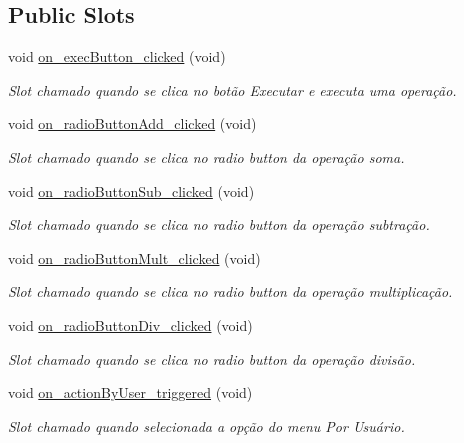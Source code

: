 \subsection*{Public Slots}
\begin{DoxyCompactItemize}
\item 
void \hyperlink{classMyCalcWindow_a6fdaf67619d3127503232c656e712656}{on\+\_\+exec\+Button\+\_\+clicked} (void)
\begin{DoxyCompactList}\small\item\em Slot chamado quando se clica no botão \textquotesingle{}Executar\textquotesingle{} e executa uma operação. \end{DoxyCompactList}\item 
void \hyperlink{classMyCalcWindow_ae1c714a5ad30c0fc67b9944481b30a05}{on\+\_\+radio\+Button\+Add\+\_\+clicked} (void)
\begin{DoxyCompactList}\small\item\em Slot chamado quando se clica no radio button da operação soma. \end{DoxyCompactList}\item 
void \hyperlink{classMyCalcWindow_a01fac328f5546feb830a67a7d35cc7f5}{on\+\_\+radio\+Button\+Sub\+\_\+clicked} (void)
\begin{DoxyCompactList}\small\item\em Slot chamado quando se clica no radio button da operação subtração. \end{DoxyCompactList}\item 
void \hyperlink{classMyCalcWindow_a553593de7766d99faf23a2053ddb4281}{on\+\_\+radio\+Button\+Mult\+\_\+clicked} (void)
\begin{DoxyCompactList}\small\item\em Slot chamado quando se clica no radio button da operação multiplicação. \end{DoxyCompactList}\item 
void \hyperlink{classMyCalcWindow_a1ac314ac5a743effc49465a295f796a4}{on\+\_\+radio\+Button\+Div\+\_\+clicked} (void)
\begin{DoxyCompactList}\small\item\em Slot chamado quando se clica no radio button da operação divisão. \end{DoxyCompactList}\item 
void \hyperlink{classMyCalcWindow_ad018832daea504f486bc1cb26f5cb0ec}{on\+\_\+action\+By\+User\+\_\+triggered} (void)
\begin{DoxyCompactList}\small\item\em Slot chamado quando selecionada a opção do menu \textquotesingle{}Por Usuário\textquotesingle{}. \end{DoxyCompactList}\item 

\end{DoxyCompactItemize}
